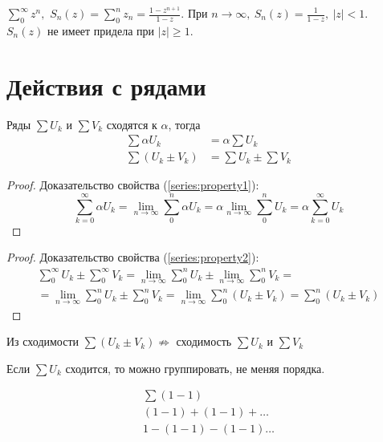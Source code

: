 \begin{example}
  $\sum\limits_0^\infty z^n,$
  $S_n(z) = \sum\limits_0^n z_n = \frac{1-z^{n+1}}{1-z}$.
  При $n \to \infty, \ S_n(z) = \frac{1}{1 - z}, \ |z| < 1$. \\
  $S_n(z)$ не имеет придела при $|z| \geq 1$.
\end{example}

\section{Действия с рядами}

\begin{theorem}
  Ряды $\sum U_k$ и $\sum V_k$ сходятся к $\alpha$, тогда
  \begin{align}
    \label{series:property1}
    \sum\alpha U_k &= \alpha\sum U_k \\
    \label{series:property2}
    \sum (U_k \pm V_k) &= \sum U_k \pm \sum V_k
  \end{align}
\end{theorem}
\begin{proof}
  Доказательство свойства (\eqref{series:property1}):
  $$\sum\limits_{k=0}^\infty \alpha U_k = \lim\limits_{n \to \infty}
  \sum\limits_0^n \alpha U_k = \alpha \lim\limits_{n \to \infty} \sum\limits_0^n U_k
  = \alpha \sum\limits_{k = 0}^\infty U_k$$
\end{proof}
\begin{proof}
  Доказательство свойства (\eqref{series:property2}):
  \begin{gather*}
      \sum\limits_0^\infty U_k \pm \sum\limits_{0}^{\infty} V_k
      = \lim\limits_{n \to \infty} \sum\limits_{0}^{n} U_k
      \pm \lim\limits_{n \to \infty} \sum\limits_{0}^{n} V_k = \\
      = \lim\limits_{n \to \infty} \sum\limits_{0}^{n} U_k
      \pm \sum\limits_{0}^{n} V_k
      = \lim\limits_{n \to \infty} \sum\limits_{0}^{n} (U_k \pm V_k)
      = \sum\limits_{0}^{n} (U_k \pm V_k)
  \end{gather*}
\end{proof}

\begin{remark}
  Из сходимости $\sum (U_k \pm V_k) \not \Rightarrow$ сходимость
  $\sum U_k$ и $\sum V_k$
\end{remark}
\begin{remark}
  Если $\sum U_k$ сходится, то можно группировать, не меняя порядка.
\end{remark}
\begin{example}
  \begin{gather*}
    \sum (1 - 1) \\
    (1 - 1) + (1 - 1) + \dots \\
    1 - (1 - 1) - (1 - 1) \dots
  \end{gather*}
\end{example}
\begin{comment}
  Нельзя раскрывать скобки и переставлять члены.
\end{comment}
